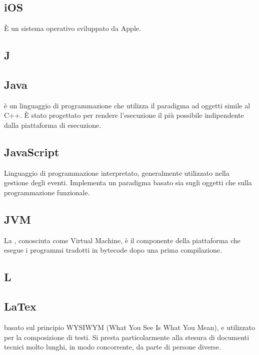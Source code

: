\subsection*{iOS}
È un sistema operativo sviluppato da Apple.

\newpage

\begin{center}
\Huge\section*{\uppercase{J}}
\end{center}

\subsection*{Java}
 è un linguaggio di programmazione che utilizza il paradigma ad oggetti simile al C++. È stato
progettato per rendere l'esecuzione il più possibile indipendente dalla piattaforma di
esecuzione.

\subsection*{JavaScript}
Linguaggio di programmazione interpretato, generalmente utilizzato nella gestione
degli eventi. Implementa un paradigma basato sia sugli oggetti che sulla programmazione
funzionale.

\subsection*{JVM}
La , conosciuta come  Virtual Machine, è il componente della piattaforma  che esegue i programmi tradotti in bytecode dopo una prima compilazione.

\newpage

\begin{center}
\Huge\section*{\uppercase{L}}
\end{center}

\subsection*{LaTex}
 basato sul principio WYSIWYM (What You See Is What You
Mean), e utilizzato per la composizione di testi. Si presta particolarmente alla stesura di
documenti tecnici molto lunghi, in modo concorrente, da parte di persone diverse.

